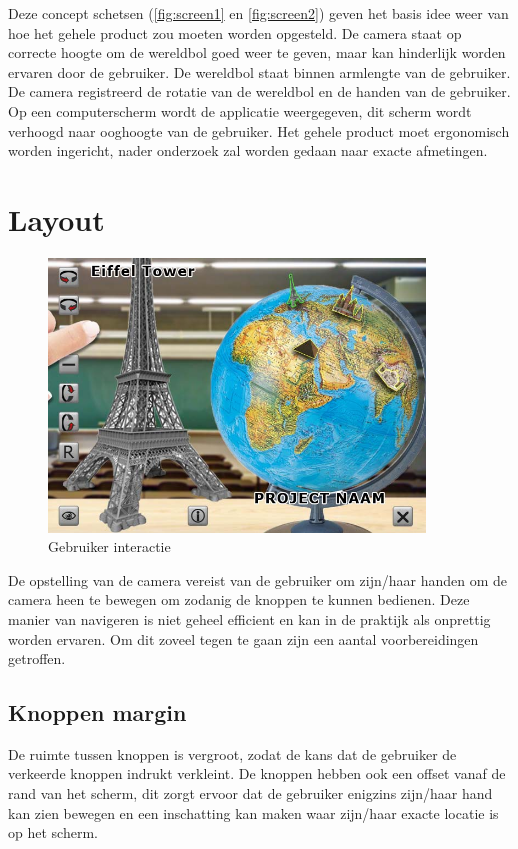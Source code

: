Deze concept schetsen (\cref{fig:screen1} en \cref{fig:screen2}) geven het basis idee weer van hoe het gehele product zou moeten worden opgesteld. De camera staat op correcte hoogte om de wereldbol goed weer te geven, maar kan hinderlijk worden ervaren door de gebruiker. De wereldbol staat binnen armlengte van de gebruiker. De camera registreerd de rotatie van de wereldbol en de handen van de gebruiker. Op een computerscherm wordt de applicatie weergegeven, dit scherm wordt verhoogd naar ooghoogte van de gebruiker. Het gehele product moet ergonomisch worden ingericht, nader onderzoek zal worden gedaan naar exacte afmetingen. 

\newpage
\section{Layout} \label{sec:layout}
\begin{figure}[h]
	\includegraphics[width=100mm]{figs/userexp1.jpg}
	\caption{Gebruiker interactie}
	\label{fig:userexp1}
\end{figure}

De opstelling van de camera vereist van de gebruiker om zijn/haar handen om de camera heen te bewegen om zodanig de knoppen te kunnen bedienen. Deze manier van navigeren is niet geheel efficient en kan in de praktijk als onprettig worden ervaren. Om dit zoveel tegen te gaan zijn een aantal voorbereidingen getroffen.
\subsection{Knoppen margin} \label{subsec:margin}
De ruimte tussen knoppen is vergroot, zodat de kans dat de gebruiker de verkeerde knoppen indrukt verkleint. De knoppen hebben ook een offset vanaf de rand van het scherm, dit zorgt ervoor dat de gebruiker enigzins zijn/haar hand kan zien bewegen en een inschatting kan maken waar zijn/haar exacte locatie is op het scherm.
